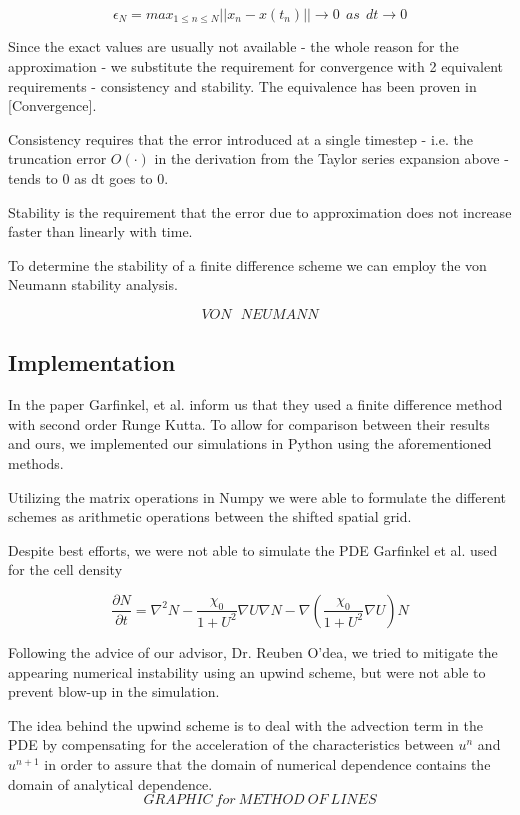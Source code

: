 \documentclass{article}
\begin{document}
$$\epsilon_N=max_{1\le n\le N}||x_n-x(t_n)||\to0\ \ as\ \ dt\to 0$$

Since the exact values are usually not available - the whole reason for the approximation - we substitute the requirement for convergence with 2 equivalent requirements - consistency and stability. The equivalence has been proven in [Convergence].

Consistency requires that the error introduced at a single timestep - i.e. the truncation error $O(\cdot)$ in the derivation from the Taylor series expansion above - tends to 0 as dt goes to 0.

 Stability is the requirement that the error due to approximation does not increase faster than linearly with time. 

To determine the stability of a finite difference scheme we can employ the von Neumann stability analysis. 

$$VON\ \ \ NEUMANN$$


\subsection{Implementation}

In the paper Garfinkel, et al. inform us that they used a finite difference method with second order Runge Kutta. To allow for comparison between their results and ours, we implemented our simulations in Python using the aforementioned methods.

Utilizing the matrix operations in Numpy we were able to formulate the different schemes as arithmetic operations between the shifted spatial grid.

Despite best efforts, we were not able to simulate the PDE Garfinkel et al. used for the cell density

$$\frac{\partial N}{\partial t}=\nabla^2N-\frac{\chi_0}{1+U^2}\nabla U \nabla N- \nabla(\frac{\chi_0}{1+U^2}\nabla U)N$$

Following the advice of our advisor, Dr. Reuben O'dea, we tried to mitigate the appearing numerical instability using an upwind scheme, but were not able to prevent blow-up in the simulation.

The idea behind the upwind scheme is to deal with the advection term in the PDE by compensating for the acceleration of the characteristics between $u^n$ and $u^{n+1}$ in order to assure that the domain of numerical dependence contains the domain of analytical dependence.
$$GRAPHIC\ for\ METHOD\ OF\ LINES$$

\pagebreak
\end{document}
